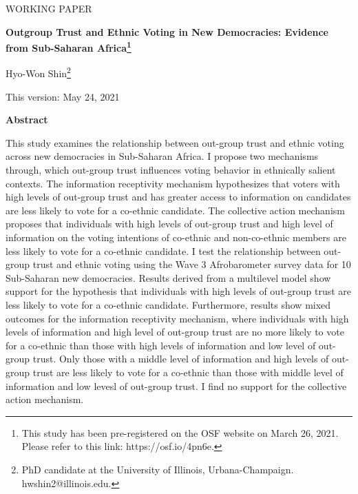 \documentclass[a4paper, 12pt]{article}
\begin{document}
\thispagestyle{plain}
\begin{center}
	\large
	WORKING PAPER
	
	\vspace{0.8cm}
	\Large
	\textbf{Outgroup Trust and Ethnic Voting in New Democracies: Evidence from Sub-Saharan Africa\footnote{This study has been pre-registered on the OSF website on March 26, 2021. Please refer to this link: https://osf.io/4pn6e.}}
	
	\vspace{0.4cm}
	\large
	Hyo-Won Shin\footnote{PhD candidate at the University of Illinois, Urbana-Champaign. hwshin2@illinois.edu.}

	\vspace{1cm}
	\large
	This version: May 24, 2021
	
	\vspace{1cm}
	\textbf{Abstract}
\end{center}
This study examines the relationship between out-group trust and ethnic voting across new democracies in Sub-Saharan Africa. I propose two mechanisms through, which out-group trust influences voting behavior in ethnically salient contexts. The information receptivity mechanism hypothesizes that voters with high levels of out-group trust and has greater access to information on candidates are less likely to vote for a co-ethnic candidate. The collective action mechanism proposes that individuals with high levels of out-group trust and high level of information on the voting intentions of co-ethnic and non-co-ethnic members are less likely to vote for a co-ethnic candidate. I test the relationship between out-group trust and ethnic voting using the Wave 3 Afrobarometer survey data for 10 Sub-Saharan new democracies. Results derived from a multilevel model show support for the hypothesis that individuals with high levels of out-group trust are less likely to vote for a co-ethnic candidate. Furthermore, results show mixed outcomes for the information receptivity mechanism, where individuals with high levels of information and high level of out-group trust are no more likely to vote for a co-ethnic than those with high levels of information and low level of out-group trust. Only those with a middle level of information and high levels of out-group trust are less likely to vote for a co-ethnic than those with middle level of information and low levesl of out-group trust. I find no support for the collective action mechanism.\\

\pagebreak
\end{document}
